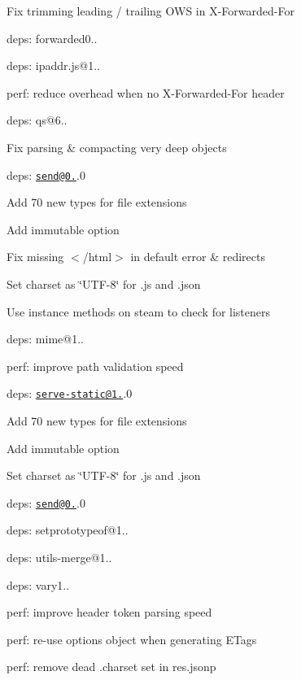 \begin{DoxyItemize}
\begin{DoxyItemize}
\item Fix trimming leading / trailing O\+WS in {\ttfamily X-\/\+Forwarded-\/\+For}
\item deps\+: forwarded0..
\item deps\+: ipaddr.\+js@1..
\item perf\+: reduce overhead when no {\ttfamily X-\/\+Forwarded-\/\+For} header
\end{DoxyItemize}
\item deps\+: qs@6..
\begin{DoxyItemize}
\item Fix parsing \& compacting very deep objects
\end{DoxyItemize}
\item deps\+: \href{mailto:send@0.16}{\tt send@0.}.0
\begin{DoxyItemize}
\item Add 70 new types for file extensions
\item Add {\ttfamily immutable} option
\item Fix missing {\ttfamily $<$/html$>$} in default error \& redirects
\item Set charset as \char`\"{}\+U\+T\+F-\/8\char`\"{} for .js and .json
\item Use instance methods on steam to check for listeners
\item deps\+: mime@1..
\item perf\+: improve path validation speed
\end{DoxyItemize}
\item deps\+: \href{mailto:serve-static@1.13}{\tt serve-\/static@1.}.0
\begin{DoxyItemize}
\item Add 70 new types for file extensions
\item Add {\ttfamily immutable} option
\item Set charset as \char`\"{}\+U\+T\+F-\/8\char`\"{} for .js and .json
\item deps\+: \href{mailto:send@0.16}{\tt send@0.}.0
\end{DoxyItemize}
\item deps\+: setprototypeof@1..
\item deps\+: utils-\/merge@1..
\item deps\+: vary1..
\begin{DoxyItemize}
\item perf\+: improve header token parsing speed
\end{DoxyItemize}
\item perf\+: re-\/use options object when generating E\+Tags
\item perf\+: remove dead {\ttfamily .charset} set in {\ttfamily res.\+jsonp}
\end{DoxyItemize}

